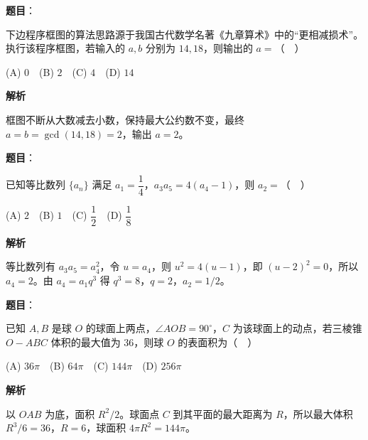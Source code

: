 \begin{answer}

\textbf{题目}：

下边程序框图的算法思路源于我国古代数学名著《九章算术》中的“更相减损术”。执行该程序框图，若输入的 $a,b$ 分别为 $14,18$，则输出的 $a=$（　）
\nopagebreak[4]
\begin{center}\end{center}
\nopagebreak[4]
(A) $0$　(B) $2$　(C) $4$　(D) $14$

\textbf{解析}

框图不断从大数减去小数，保持最大公约数不变，最终 $a=b=\gcd(14,18)=2$，输出 $a=2$。


\end{answer}
\begin{answer}

\textbf{题目}：

已知等比数列 $\{a_n\}$ 满足 $a_1=\dfrac14$，$a_3a_5=4(a_4-1)$，则 $a_2=$（　）

(A) $2$　(B) $1$　(C) $\dfrac12$　(D) $\dfrac18$

\textbf{解析}

等比数列有 $a_3a_5=a_4^2$，令 $u=a_4$，则 $u^2=4(u-1)$，即 $(u-2)^2=0$，所以 $a_4=2$。由 $a_4=a_1q^3$ 得 $q^3=8$，$q=2$，$a_2=1/2$。


\end{answer}
\begin{answer}

\textbf{题目}：

已知 $A,B$ 是球 $O$ 的球面上两点，$\angle AOB=90^\circ$，$C$ 为该球面上的动点，若三棱锥 $O-ABC$ 体积的最大值为 $36$，则球 $O$ 的表面积为（　）

(A) $36\pi$　(B) $64\pi$　(C) $144\pi$　(D) $256\pi$

\textbf{解析}

以 $OAB$ 为底，面积 $R^2/2$。球面点 $C$ 到其平面的最大距离为 $R$，所以最大体积 $R^3/6=36$，$R=6$，球面积 $4\pi R^2=144\pi$。


\end{answer}
